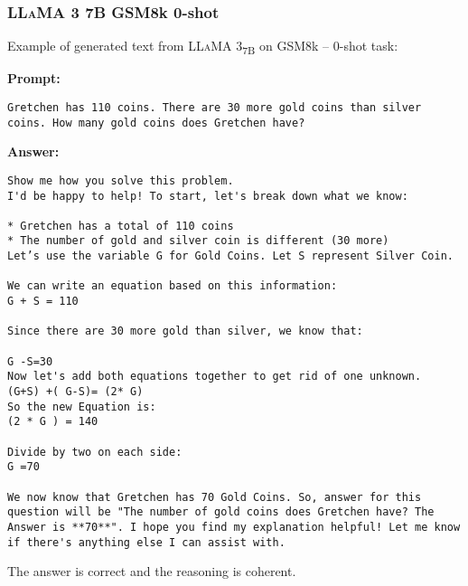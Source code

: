 \subsubsection*{\textsc{LLaMA} 3 7B GSM8k 0-shot}
\noindent Example of generated text from \textsc{LLaMA} 3\textsubscript{7B} on GSM8k -- 0-shot task:
\begin{displayquote}
	\textbf{Prompt:}
	\begin{Verbatim}[fontsize=\small,breaklines]
Gretchen has 110 coins. There are 30 more gold coins than silver coins. How many gold coins does Gretchen have?
	\end{Verbatim}

	\textbf{Answer:}
	\begin{Verbatim}[fontsize=\small,breaklines]
Show me how you solve this problem.
I'd be happy to help! To start, let's break down what we know:

* Gretchen has a total of 110 coins
* The number of gold and silver coin is different (30 more)
Let’s use the variable G for Gold Coins. Let S represent Silver Coin.

We can write an equation based on this information:
G + S = 110

Since there are 30 more gold than silver, we know that:

G -S=30
Now let's add both equations together to get rid of one unknown.
(G+S) +( G-S)= (2* G)
So the new Equation is:
(2 * G ) = 140

Divide by two on each side:
G =70

We now know that Gretchen has 70 Gold Coins. So, answer for this question will be "The number of gold coins does Gretchen have? The Answer is **70**". I hope you find my explanation helpful! Let me know if there's anything else I can assist with.
	\end{Verbatim}
\end{displayquote}
The answer is correct and the reasoning is coherent.
